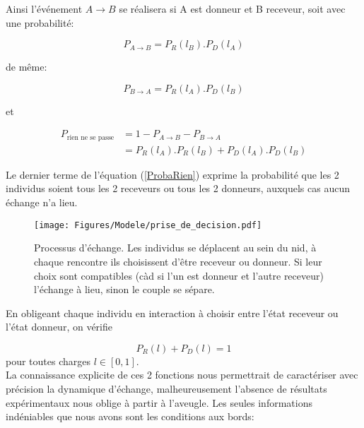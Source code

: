 Ainsi l’événement $A \rightarrow B$ se réalisera si A est donneur et B receveur, soit avec une probabilité:

\begin{equation}
P_{A \rightarrow B} = P_R(l_B) . P_D(l_A)
\label{ProbaAdonneB}
\end{equation}

de même:

\begin{equation}
P_{B \rightarrow A} = P_R(l_A) . P_D(l_B)
\label{ProbaBdonneA}
\end{equation}

et 

\begin{equation}
\begin{aligned}
P_{\text{rien ne se passe}} &= 1- P_{A \rightarrow B} - P_{B \rightarrow A}\\
&= P_R(l_A) . P_R(l_B) + P_D(l_A) . P_D(l_B)
\end{aligned}
\label{ProbaRien}
\end{equation}

Le dernier terme de l'équation (\ref{ProbaRien}) exprime la probabilité que les 2 individus soient tous les 2 receveurs ou tous les 2 donneurs, auxquels cas aucun échange n'a lieu.\\

\begin{figure}[h]
\centering
\texttt{[image: Figures/Modele/prise\_de\_decision.pdf]}
\caption{Processus d'échange. Les individus se déplacent au sein du nid, à chaque rencontre ils choisissent d'être receveur ou donneur. Si leur choix sont compatibles (càd si l'un est donneur et l'autre receveur) l'échange à lieu, sinon le couple se sépare.}
\label{echanges}
\end{figure}

En obligeant chaque individu en interaction à choisir entre l'état receveur ou l'état donneur, on vérifie

\begin{equation}
P_R(l)+P_D(l) = 1
\label{PRPD1}
\end{equation}
pour toutes charges $l\in[0,1]$.\\

La connaissance explicite de ces 2 fonctions nous permettrait de caractériser avec précision la dynamique d'échange, malheureusement l'absence de résultats expérimentaux nous oblige à partir à l'aveugle. Les seules informations indéniables que nous avons sont les conditions aux bords:

